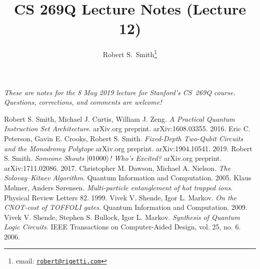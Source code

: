 \documentclass[12pt]{article}
\title{CS 269Q Lecture Notes (Lecture 12)}
\author{%
Robert S.\ Smith\footnote{email: \href{mailto:robert@rigetti.com}{\texttt{robert@rigetti.com}}}%
}
\date{}
\begin{document}
\maketitle

\begin{center}
\textit{These are notes for the 8 May 2019 lecture for Stanford's CS~269Q course. Questions, corrections, and comments are welcome!}
\end{center}

\tableofcontents

\newpage







\begin{thebibliography}{1}
   Robert S. Smith, Michael J. Curtis, William J. Zeng. {\em A Practical Quantum Instruction Set Architecture}. arXiv.org preprint. arXiv:1608.03355. 2016.
   Eric C. Peterson, Gavin E. Crooks, Robert S. Smith. {\em Fixed-Depth Two-Qubit Circuits and the Monodromy Polytope} arXiv.org preprint. arXiv:1904.10541. 2019.
   Robert S. Smith. {\em Someone Shouts $\ket{01000}$! Who's Excited?} arXiv.org preprint. arXiv:1711.02086. 2017.
   Christopher M. Dawson, Michael A. Nielson. {\em The Solovay--Kitaev Algorithm}. Quantum Information and Computation. 2005. 
   Klaus M{\o}lmer, Anders S{\o}rensen. {\em Multi-particle entanglement of hot trapped ions}. Physical Review Letters 82. 1999.
   Vivek V. Shende, Igor L. Markov. {\em On the CNOT-cost of TOFFOLI gates}. Quantum Information and Computation. 2009.
   Vivek V. Shende, Stephen S. Bullock, Igor L. Markov. {\em Synthesis of Quantum Logic Circuits}. IEEE Transactions on Computer-Aided Design, vol. 25, no. 6. 2006.
\end{thebibliography}
\end{document}
